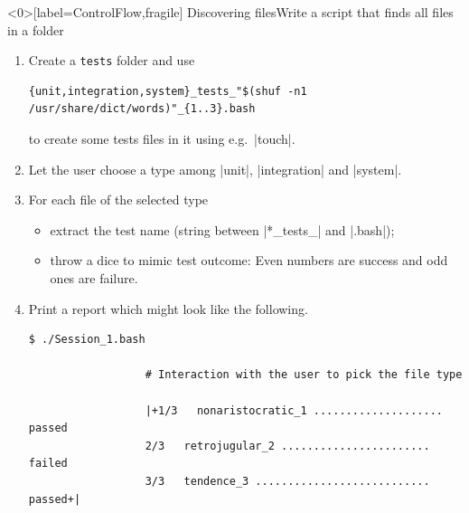 
\begin{frame}<0>[label=ControlFlow,fragile]
    {Discovering files}{Write a script that finds all files in a folder}
    \vspace{-1mm}
    \begin{enumerate}
        \item Create a \texttt{tests} folder and use
              \begin{lstlisting}[style=MyBash, numbers=none, aboveskip=3mm, belowskip=-5mm, style=smaller, xleftmargin=2mm, xrightmargin=10mm]
                  {unit,integration,system}_tests_"$(shuf -n1 /usr/share/dict/words)"_{1..3}.bash
              \end{lstlisting}
              to create some tests files in it using e.g.\ \bash|touch|.

        \item Let the user choose a type among \bash|unit|, \bash|integration| and \bash|system|.
        \item For each file of the selected type
              \begin{itemize}
                  \item extract the test name (string between \bash|*_tests_| and \bash|.bash|);
                  \item throw a dice to mimic test outcome: Even numbers are success and odd ones are failure.
              \end{itemize}
        \item Print a report which might look like the following.
              \begin{lstlisting}[style=MyBash, numbers=none, aboveskip=3mm, belowskip=-5mm, style=smaller, xleftmargin=2mm, xrightmargin=10mm]
                  $ ./Session_1.bash

                  # Interaction with the user to pick the file type

                  |+1/3   nonaristocratic_1 ....................  passed
                  2/3   retrojugular_2 .......................  failed
                  3/3   tendence_3 ...........................  passed+|
              \end{lstlisting}
    \end{enumerate}
\end{frame}
